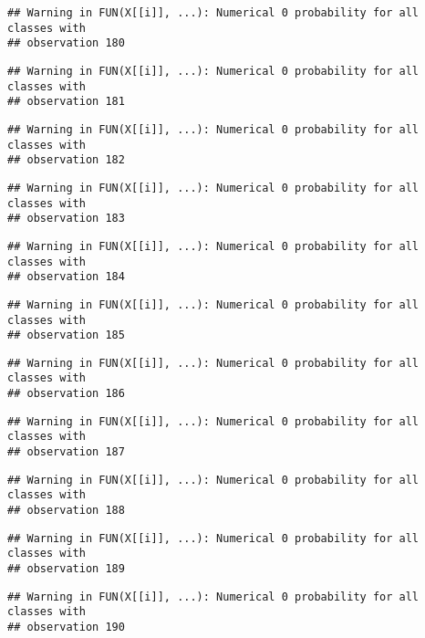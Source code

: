 \documentclass[
]{article}
\begin{document}
\begin{verbatim}
## Warning in FUN(X[[i]], ...): Numerical 0 probability for all classes with
## observation 180
\end{verbatim}

\begin{verbatim}
## Warning in FUN(X[[i]], ...): Numerical 0 probability for all classes with
## observation 181
\end{verbatim}

\begin{verbatim}
## Warning in FUN(X[[i]], ...): Numerical 0 probability for all classes with
## observation 182
\end{verbatim}

\begin{verbatim}
## Warning in FUN(X[[i]], ...): Numerical 0 probability for all classes with
## observation 183
\end{verbatim}

\begin{verbatim}
## Warning in FUN(X[[i]], ...): Numerical 0 probability for all classes with
## observation 184
\end{verbatim}

\begin{verbatim}
## Warning in FUN(X[[i]], ...): Numerical 0 probability for all classes with
## observation 185
\end{verbatim}

\begin{verbatim}
## Warning in FUN(X[[i]], ...): Numerical 0 probability for all classes with
## observation 186
\end{verbatim}

\begin{verbatim}
## Warning in FUN(X[[i]], ...): Numerical 0 probability for all classes with
## observation 187
\end{verbatim}

\begin{verbatim}
## Warning in FUN(X[[i]], ...): Numerical 0 probability for all classes with
## observation 188
\end{verbatim}

\begin{verbatim}
## Warning in FUN(X[[i]], ...): Numerical 0 probability for all classes with
## observation 189
\end{verbatim}

\begin{verbatim}
## Warning in FUN(X[[i]], ...): Numerical 0 probability for all classes with
## observation 190
\end{verbatim}
\end{document}
